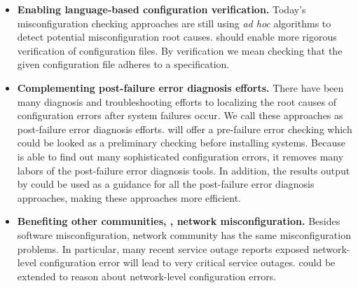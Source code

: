 \begin{itemize}

\item {\bf Enabling language-based configuration verification.}
  Today's misconfiguration checking approaches are still using {\em ad hoc}
  algorithms to detect potential misconfiguration root causes. \app 
  should enable more rigorous verification of configuration files. By verification we
  mean checking that the given configuration file adheres to a
  specification.

\item {\bf Complementing post-failure error diagnosis efforts.}
  There have been many diagnosis and troubleshooting efforts to localizing
  the root causes of configuration errors after system failures occur.
  We call these approaches as post-failure error diagnosis efforts.
  \app will offer a pre-failure error checking
  which could be looked as a preliminary checking before installing
  systems. Because \app is able to find out many sophisticated 
  configuration errors, it removes many labors of 
  the post-failure error diagnosis tools. In addition, the results
  output by \app could be used as a guidance for all the post-failure
  error diagnosis approaches, making these approaches more efficient.

\item {\bf Benefiting other communities, \eg, network misconfiguration.} 
  Besides software misconfiguration, network community has the same 
  misconfiguration problems. In particular, many recent service outage 
  reports exposed network-level configuration error will lead to
  very critical service outages. \app could be extended to reason about
  network-level configuration errors.

\end{itemize}

